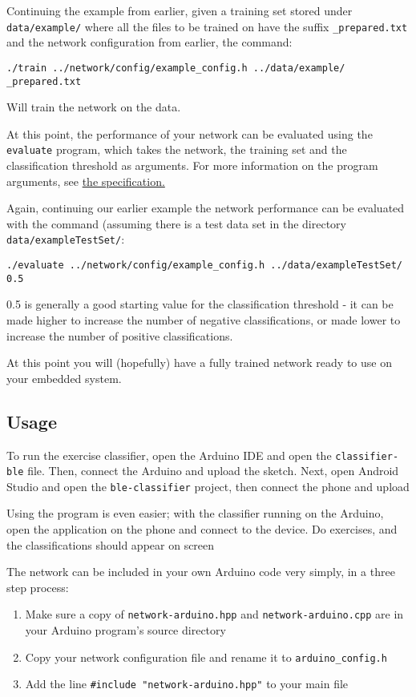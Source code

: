\documentclass[a4paper]{article}
\begin{document}
Continuing the example from earlier, given a training set stored under \lstinline{data/example/} where all the files to be trained on have the suffix \lstinline{_prepared.txt} and the network configuration from earlier, the command:

\lstinline{./train ../network/config/example_config.h ../data/example/ _prepared.txt}

Will train the network on the data.

At this point, the performance of your network can be evaluated using the \lstinline{evaluate} program, which takes the network, the training set and the classification threshold as arguments. For more information on the program arguments, see \hyperref[subsubsec:dc_csa_evaluate]{the specification.}

Again, continuing our earlier example the network performance can be evaluated with the command (assuming there is a test data set in the directory \lstinline{data/exampleTestSet/}:

\lstinline{./evaluate ../network/config/example_config.h ../data/exampleTestSet/ 0.5}

0.5 is generally a good starting value for the classification threshold - it can be made higher to increase the number of negative classifications, or made lower to increase the number of positive classifications.

At this point you will (hopefully) have a fully trained network ready to use on your embedded system.

\subsection{Usage}%
\label{subsec:a1_usage}

To run the exercise classifier,  open the Arduino IDE and open the \lstinline{classifier-ble} file. Then, connect the Arduino and upload the sketch.
Next, open Android Studio and open the \lstinline{ble-classifier} project, then connect the phone and upload

Using the program is even easier; with the classifier running on the Arduino, open the application on the phone and connect to the device. Do exercises, and the classifications should appear on screen

The network can be included in your own Arduino code very simply, in a three step process:

\begin{enumerate}
\item Make sure a copy of \lstinline{network-arduino.hpp} and \lstinline{network-arduino.cpp} are in your Arduino program's source directory
\item Copy your network configuration file and rename it to \lstinline{arduino_config.h}
\item Add the line \lstinline{#include "network-arduino.hpp"} to your main file
\end{enumerate}
\end{document}
